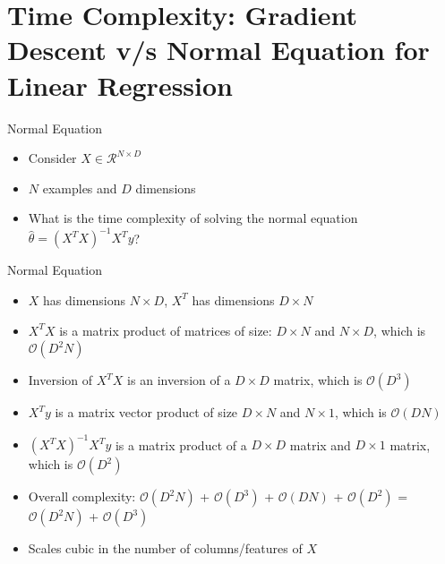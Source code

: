 \documentclass[usenames,dvipsnames]{beamer}
\begin{document}
  \section{Time Complexity: Gradient Descent v/s Normal Equation for Linear Regression}
  \begin{frame}{Normal Equation}

	\begin{itemize}[<+->]
		\item Consider $X\in \mathcal{R}^{N\times D}$
		\item $N$ examples and $D$ dimensions
		\item What is the time complexity of solving the normal equation $\hat{\theta} = (X^TX)^{-1}X^Ty$?
	\end{itemize}
	
	

\end{frame}

\begin{frame}{Normal Equation}

\begin{itemize}[<+->]
	\item $X$ has dimensions $N\times D$, $X^T$ has dimensions $D \times N$
	\item $X^TX$ is a matrix product of matrices of size: $D \times N$ and $N \times D$, which is $\mathcal{O}(D^{2}N)$
	\item Inversion of $X^TX$ is an inversion of a $D\times D$ matrix, which is $\mathcal{O}(D^{3})$
	\item $X^Ty$ is a matrix vector product of size $D \times N$ and $N \times 1$, which is $\mathcal{O}(DN)$
	\item $(X^TX)^{-1}X^Ty$ is a matrix product of a  $D\times D$ matrix and $D \times 1$ matrix, which is $\mathcal{O}(D^2)$
	\item Overall complexity: $\mathcal{O}(D^{2}N)$ + $\mathcal{O}(D^{3})$ + $\mathcal{O}(DN)$ + $\mathcal{O}(D^2)$ = $\mathcal{O}(D^{2}N)$ + $\mathcal{O}(D^{3})$
	\item Scales cubic in the number of columns/features of $X$
\end{itemize}



\end{frame}
\end{document}
